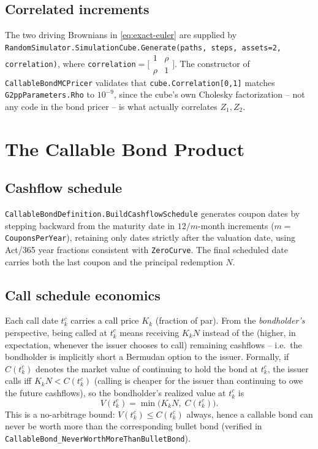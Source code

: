 \documentclass[11pt,a4paper]{article}
\newcommand{\coderef}[1]{\texttt{\color{blue!60!black}#1}}
\theoremstyle{definition}
\begin{document}
\subsection{Correlated increments}

The two driving Brownians in \eqref{eq:exact-euler} are supplied by
\coderef{RandomSimulator.SimulationCube.Generate(paths, steps, assets{=}2, correlation)},
where \texttt{correlation}$=\bigl[\begin{smallmatrix}1&\rho\\\rho&1\end{smallmatrix}\bigr]$.
The constructor of \coderef{CallableBondMCPricer} validates that
\texttt{cube.Correlation[0,1]} matches \coderef{G2ppParameters.Rho} to
$10^{-9}$, since the cube's own Cholesky factorization -- not any code in
the bond pricer -- is what actually correlates $Z_1,Z_2$.

\section{The Callable Bond Product}
\label{sec:product}

\subsection{Cashflow schedule}

\coderef{CallableBondDefinition.BuildCashflowSchedule} generates coupon
dates by stepping backward from the maturity date in
$12/m$-month increments ($m=$ \coderef{CouponsPerYear}), retaining only
dates strictly after the valuation date, using Act/365 year fractions
consistent with \coderef{ZeroCurve}. The final scheduled date carries both
the last coupon and the principal redemption $N$.

\subsection{Call schedule economics}

Each call date $t_k^c$ carries a call price $K_k$ (fraction of par). From the
\emph{bondholder's} perspective, being called at $t_k^c$ means receiving
$K_k N$ instead of the (higher, in expectation, whenever the issuer chooses
to call) remaining cashflows -- i.e.\ the bondholder is implicitly short a
Bermudan option to the issuer. Formally, if $C(t_k^c)$ denotes the
market value of continuing to hold the bond at $t_k^c$, the issuer calls
iff $K_kN < C(t_k^c)$ (calling is cheaper for the issuer than continuing to
owe the future cashflows), so the bondholder's realized value at $t_k^c$ is
\begin{equation}
  V(t_k^{c}) = \min\bigl(K_k N,\; C(t_k^c)\bigr).
  \label{eq:call-decision}
\end{equation}
This is a no-arbitrage bound: $V(t_k^c)\le C(t_k^c)$ always, hence a
callable bond can never be worth more than the corresponding bullet bond
(verified in \texttt{CallableBond\_\allowbreak NeverWorthMoreThanBulletBond}).
\end{document}
